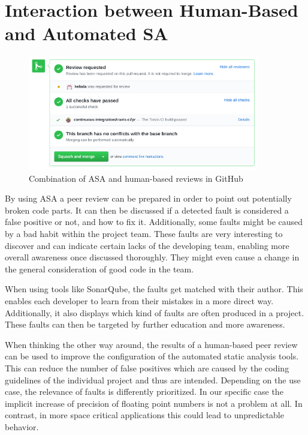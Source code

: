 \documentclass{scrreprt}
\begin{document}
\section{Interaction between Human-Based and Automated SA}
\label{sec:humand-based-vs-automated-sa}

\begin{figure}[h]
	\centering
	\includegraphics[width=0.9\textwidth]{img/github_pr_review}
	\caption[GitHub PR review]{Combination of ASA and human-based reviews in GitHub}
	\label{fig:github_pr_review}
\end{figure}

By using ASA a peer review can be prepared in order to point out potentially broken code parts. It can then be discussed if a detected fault is considered a false positive or not, and how to fix it. Additionally, some faults might be caused by a bad habit within the project team. These faults are very interesting to discover and can indicate certain lacks of the developing team, enabling more overall awareness once discussed thoroughly. They might even cause a change in the general consideration of good code in the team.  

When using tools like SonarQube, the faults get matched with their author. This enables each developer to learn from their mistakes in a more direct way. Additionally, it also displays which kind of faults are often produced in a project. These faults can then be targeted by further education and more awareness.

When thinking the other way around, the results of a human-based peer review can be used to improve the configuration of the automated static analysis tools. This can reduce the number of false positives which are caused by the coding guidelines of the individual project and thus are intended.
Depending on the use case, the relevance of faults is differently prioritized. In our specific case the implicit increase of precision of floating point numbers is not a problem at all. In contrast, in more space critical applications this could lead to unpredictable behavior.
\end{document}
